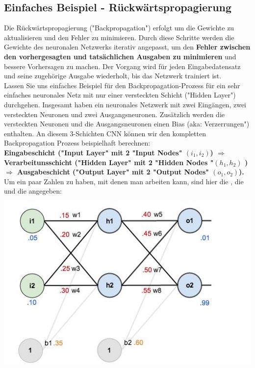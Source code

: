 \documentclass[12pt]{article}
\begin{document}
\subsection{Einfaches Beispiel - Rückwärtspropagierung}

Die Rückwärtspropagierung ("Backpropagation") erfolgt um die Gewichte zu aktualisieren und den Fehler zu minimieren. Durch diese Schritte werden die Gewichte des neuronalen Netzwerks iterativ angepasst, um den \textbf{Fehler zwischen den vorhergesagten und tatsächlichen Ausgaben zu minimieren} und bessere Vorhersagen zu machen. Der Vorgang wird für jeden Eingabedatensatz und seine zugehörige Ausgabe wiederholt, bis das Netzwerk trainiert ist.
\\Lassen Sie uns einfaches Beispiel für den Backpropagation-Prozess für ein sehr einfaches neuronales Netz mit nur einer versteckten Schicht ("Hidden Layer") durchgehen. Insgesamt haben ein neuronales Netzwerk mit zwei Eingängen, zwei versteckten Neuronen und zwei Ausgangsneuronen. Zusätzlich werden die versteckten Neuronen und die Ausgangsneuronen einen Bias (aka: Verzerrungen") enthalten. An diesem 3-Schichten CNN können wir den kompletten Backpropagation Prozess beispielhaft berechnen:\\
\textbf{Eingabeschicht ("Input Layer" mit 2 "Input Nodes" $(i_1,i_2)$) $\Rightarrow$ Verarbeitunsschicht ("Hidden Layer" mit 2 "Hidden Nodes "$(h_1,h_2)$ ) $\Rightarrow$ Ausgabeschicht ("Output Layer" mit 2 "Output Nodes" $(o_1,o_2)$).} \\ 
Um ein paar Zahlen zu haben, mit denen man arbeiten kann, sind hier die {\color{red}{anfänglichen Gewichte}}, die {\color{orange}{Bias("Verzerrungen")}} und die {\color{blue}{Trainingsinputs/-outputs}} angegeben:\\

\begin{center}
\includegraphics{Backpropagation_Example3} 
\end{center}
\end{document}
